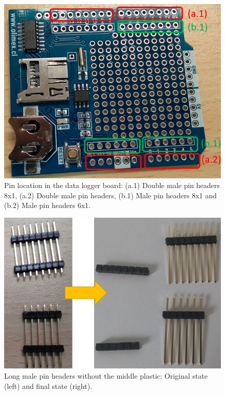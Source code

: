 \documentclass[12pt,letterpaper]{article}
\numberwithin{figure}{section}
\numberwithin{equation}{section}
\numberwithin{table}{section}
\begin{document}
\begin{figure}[H]
    \centering
    \includegraphics[scale=0.5]{Figuras/figure_14.jpg}
    \caption{Pin location in the data logger board: (a.1) Double male pin headers 8x1, (a.2) Double male pin headers, (b.1) Male pin headers 8x1 and (b.2) Male pin headers 6x1.}
    \label{fig:14}
\end{figure}

\begin{figure}[H]
    \centering
    \includegraphics[scale=0.5]{Figuras/figure_15.jpg}
    \caption{Long male pin headers without the middle plastic: Original state (left) and final state (right).}
    \label{fig:15}
\end{figure}
\end{document}
